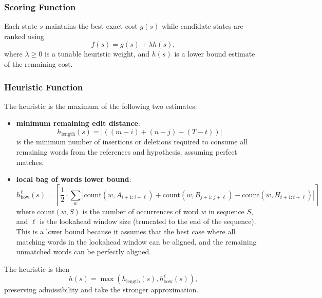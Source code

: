 \subsubsection{Scoring Function}
Each state $s$ maintains the best exact cost $g(s)$ while candidate states are ranked using 
\begin{equation}
    f(s) = g(s) + \lambda h(s),
\end{equation} 
where $\lambda \ge 0$ is a tunable heuristic weight, and $h(s)$ is a lower bound estimate of the remaining cost.
\subsubsection{Heuristic Function}
The heuristic is the maximum of the following two estimates:
\begin{itemize}
    \item \textbf{minimum remaining edit distance}:
    \begin{equation}
    h_\mathrm{length}(s) = |((m-i) + (n-j) - (T-t))|
    \end{equation} 
    is the minimum number of insertions or deletions required to consume all remaining words from the references and hypothesis, assuming perfect matches.
    \item \textbf{local bag of words lower bound}:
    \begin{equation}
    h_\mathrm{bow}^\ell(s) = \left\lceil\frac{1}{2}\cdot\sum_{w} |\mathrm{count}(w, A_{i+1:i+\ell}) + \mathrm{count}(w, B_{j+1:j+\ell}) - \mathrm{count}(w, H_{t+1:t+\ell})|\right\rceil
    \end{equation}
    where $\mathrm{count}(w, S)$ is the number of occurrences of word $w$ in sequence $S$, and $\ell$ is the lookahead window size (truncated to the end of the sequence). This is a lower bound because it assumes that the best case where all matching words in the lookahead window can be aligned, and the remaining unmatched words can be perfectly aligned.
\end{itemize}
The heuristic is then
\begin{equation}
h(s) = \max(h_\mathrm{length}(s), h_\mathrm{bow}^\ell(s)),
\end{equation}
preserving admissibility and take the stronger approximation.
